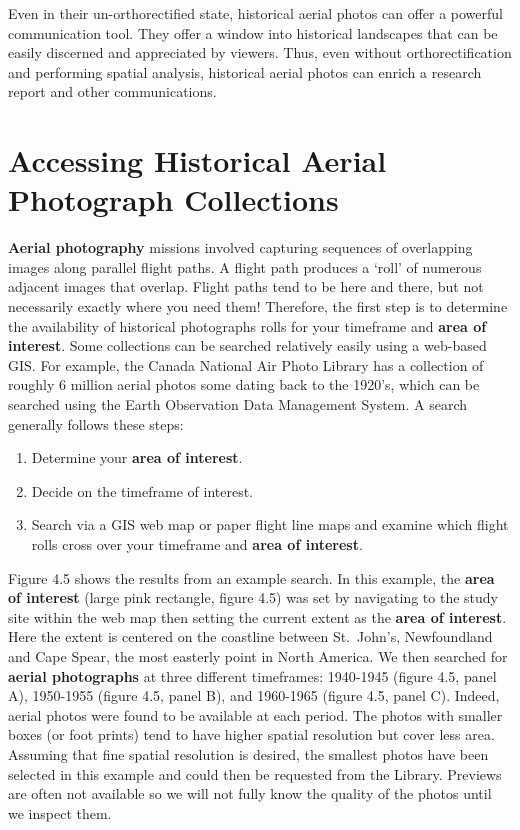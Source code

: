 \documentclass[
]{book}
\providecommand{\tightlist}{%
  \setlength{\itemsep}{0pt}\setlength{\parskip}{0pt}}
\begin{document}
Even in their un-orthorectified state, historical aerial photos can offer a powerful communication tool. They offer a window into historical landscapes that can be easily discerned and appreciated by viewers. Thus, even without orthorectification and performing spatial analysis, historical aerial photos can enrich a research report and other communications.

\hypertarget{accessing-historical-aerial-photograph-collections}{%
\section{Accessing Historical Aerial Photograph Collections}\label{accessing-historical-aerial-photograph-collections}}

\textbf{Aerial photography} missions involved capturing sequences of overlapping images along parallel flight paths. A flight path produces a `roll' of numerous adjacent images that overlap. Flight paths tend to be here and there, but not necessarily exactly where you need them! Therefore, the first step is to determine the availability of historical photographs rolls for your timeframe and \textbf{area of interest}. Some collections can be searched relatively easily using a web-based GIS. For example, the Canada National Air Photo Library has a collection of roughly 6 million aerial photos some dating back to the 1920's, which can be searched using the Earth Observation Data Management System. A search generally follows these steps:

\begin{enumerate}
\def\labelenumi{\arabic{enumi}.}
\tightlist
\item
  Determine your \textbf{area of interest}.
\item
  Decide on the timeframe of interest.
\item
  Search via a GIS web map or paper flight line maps and examine which flight rolls cross over your timeframe and \textbf{area of interest}.
\end{enumerate}

Figure 4.5 shows the results from an example search. In this example, the \textbf{area of interest} (large pink rectangle, figure 4.5) was set by navigating to the study site within the web map then setting the current extent as the \textbf{area of interest}. Here the extent is centered on the coastline between St.~John's, Newfoundland and Cape Spear, the most easterly point in North America. We then searched for \textbf{aerial photographs} at three different timeframes: 1940-1945 (figure 4.5, panel A), 1950-1955 (figure 4.5, panel B), and 1960-1965 (figure 4.5, panel C). Indeed, aerial photos were found to be available at each period. The photos with smaller boxes (or foot prints) tend to have higher spatial resolution but cover less area. Assuming that fine spatial resolution is desired, the smallest photos have been selected in this example and could then be requested from the Library. Previews are often not available so we will not fully know the quality of the photos until we inspect them.
\end{document}
